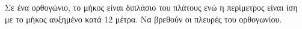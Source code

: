Σε ένα ορθογώνιο, το μήκος είναι διπλάσιο του πλάτους ενώ η περίμετρος είναι ίση με το μήκος αυξημένο κατά 12 μέτρα. Να βρεθούν οι πλευρές του ορθογωνίου.